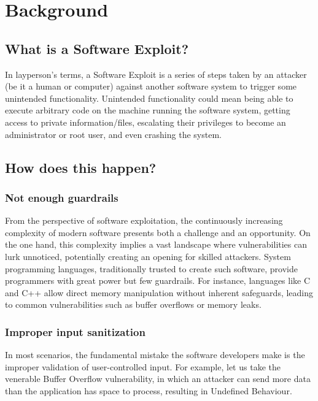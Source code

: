 \documentclass{article}
\begin{document}
\section{Background}%

\subsection{What is a Software Exploit?}%
In layperson's terms, a Software Exploit is a series of steps taken by an attacker (be it a human or computer) against another software system to trigger some unintended functionality. Unintended functionality could mean being able to execute arbitrary code on the machine running the software system, getting access to private information/files, escalating their privileges to become an administrator or root user, and even crashing the system.

\subsection{How does this happen?}%
\subsubsection{Not enough guardrails}%
From the perspective of software exploitation, the continuously increasing complexity of modern software presents both a challenge and an opportunity. On the one hand, this complexity implies a vast landscape where vulnerabilities can lurk unnoticed, potentially creating an opening for skilled attackers. System programming languages, traditionally trusted to create such software, provide programmers with great power but few guardrails. For instance, languages like C and C++ allow direct memory manipulation without inherent safeguards, leading to common vulnerabilities such as buffer overflows or memory leaks.

\subsubsection{Improper input sanitization}%
In most scenarios, the fundamental mistake the software developers make is the improper validation of user-controlled input. For example, let us take the venerable Buffer Overflow vulnerability, in which an attacker can send more data than the application has space to process, resulting in Undefined Behaviour.
\end{document}
